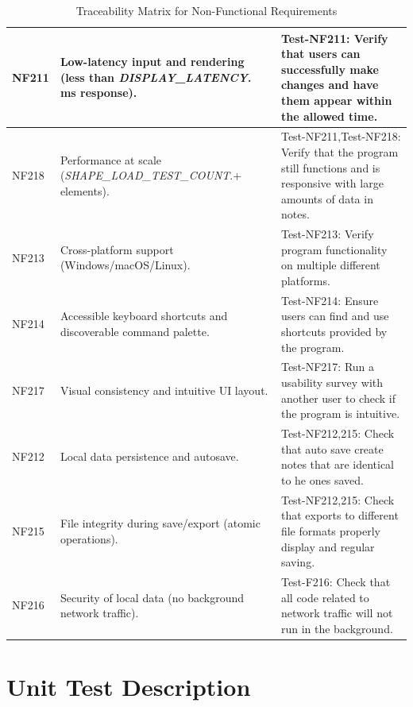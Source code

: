 \documentclass[12pt, titlepage]{article}
\begin{document}
\begin{table}[H]
\centering
\caption{Traceability Matrix for Non-Functional Requirements}
\begin{tabular}{|p{2.5cm}|p{6cm}|p{6cm}|}
\hline
NF211 & Low-latency input and rendering (less than \textit{DISPLAY\_LATENCY}. ms response). & Test-NF211: Verify that users can successfully make changes and have them appear within the allowed time. \\
\hline
NF218 & Performance at scale (\textit{SHAPE\_LOAD\_TEST\_COUNT}.+ elements). & Test-NF211,Test-NF218: Verify that the program still functions and is responsive with large amounts of data in notes. \\
\hline
NF213 & Cross-platform support (Windows/macOS/Linux). & Test-NF213: Verify program functionality on multiple different platforms. \\
\hline
NF214 & Accessible keyboard shortcuts and discoverable command palette. & Test-NF214: Ensure users can find and use shortcuts provided by the program. \\
\hline
NF217 & Visual consistency and intuitive UI layout. & Test-NF217: Run a usability survey with another user to check if the program is intuitive. \\
\hline
NF212 & Local data persistence and autosave. & Test-NF212,215: Check that auto save  create notes that are identical to he ones saved. \\
\hline
NF215 & File integrity during save/export (atomic operations). & Test-NF212,215: Check that exports to different file formats properly display and regular saving. \\
\hline
NF216 & Security of local data (no background network traffic). & Test-F216: Check that all code related to network traffic will not run in the background. \\
\hline
\end{tabular}
\end{table}



\section{Unit Test Description}


\end{document}
